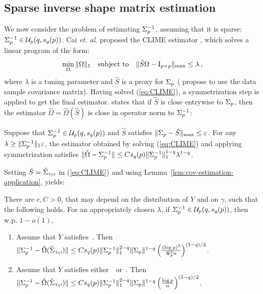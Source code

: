 \documentclass[times,sort&compress,3p]{elsarticle}
\begin{document}
\subsection{Sparse inverse shape matrix estimation}
\label{sec:app-sparse-inv}

We now consider the problem of estimating $\Sigma_p^{-1}$, assuming that it is sparse: $\Sigma_p^{-1}\in \mathcal{U}_p(q,s_q(p))$. 
Cai {\it et. al.}  proposed the CLIME estimator \cite{cai2011constrained}, which solves a linear program of the form:
\begin{equation}\label{eq:CLIME}
    \min_{\Omega} \|\Omega\|_1 \quad\textrm{subject to}\quad \|\hat{S}\Omega-\mathrm{I}_{p \times p}\|_{\max}\le \lambda \,,
\end{equation}
where $\lambda$ is a tuning parameter and $\hat{S}$ is a proxy for $\Sigma_p$ (\cite{cai2011constrained} propose to use the data sample covariance matrix). Having solved (\ref{eq:CLIME}), a symmetrization step is applied to get the final estimator. 
\cite[Theorem 6]{cai2011constrained} states that if $\hat{S}$ is close entrywise to $\Sigma_p$, then the estimator $\hat{\Omega}=\hat{\Omega}(\hat{S})$ is close in operator norm to $\Sigma_p^{-1}$:
\begin{lemma}\label{lem:cai}
    Suppose that $\Sigma_p^{-1}\in \mathcal{U}_p(q,s_q(p))$ and $\hat{S}$ satisfies $\|\Sigma_p-\hat{S}\|_{\max}\le \varepsilon$. For any $\lambda\ge \|\Sigma_p^{-1}\|_1\varepsilon$, the estimator obtained by solving (\ref{eq:CLIME}) and applying symmetrization satisfies $\|\hat{\Omega}-\Sigma_p^{-1}\| \le Cs_q(p)\|\Sigma_p^{-1}\|_1^{1-q}\lambda^{1-q}$. 
\end{lemma}
Setting $\hat{S}=\hat{\Sigma}_{\mbox{\tiny{Tyl}}}$ in (\ref{eq:CLIME}) and using Lemma~\ref{lem:cov-estimation-application}, yields:
\begin{corollary}\label{cor:precision}
    There are $c,C>0$, that may depend on the distribution of $Y$ and on $\gamma$, such that the following holds. For an appropriately chosen $\lambda$, 
    if $\Sigma_p^{-1}\in \mathcal{U}_p(q,s_q(p))$, then w.p. $1-o(1)$,
    \begin{enumerate}
        \item 
        Assume that $Y$ satisfies~\AssumLC. Then $\|\Sigma_p^{-1}-\hat{\Omega}(\hat{\Sigma}_{\mbox{\tiny{Tyl}}})\| \le Cs_q(p)\|\Sigma_p^{-1}\|_1^{2-q}\|\Sigma_p\|^{1-q}\left( \frac{(\log p)^2}{\Psi_p^2 n} \right)^{(1-q)/2}$. 
        \item 
        Assume that $Y$ satisfies either~\AssumIndep~or~\AssumCCPSB. Then
        $\|\Sigma_p^{-1}-\hat{\Omega}(\hat{\Sigma}_{\mbox{\tiny{Tyl}}})\| \le Cs_q(p)\|\Sigma_p^{-1}\|_1^{2-q}\|\Sigma_p\|^{1-q}\left( {\frac{\log p}{n}} \right)^{(1-q)/2}$.
    \end{enumerate}
\end{corollary}
\end{document}
